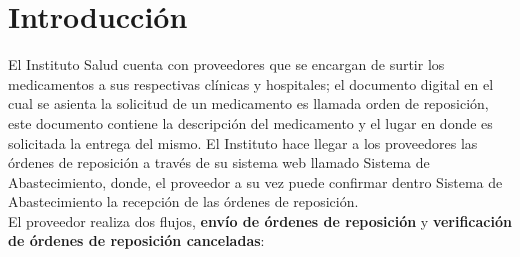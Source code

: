 \documentclass[letterpaper,11pt]{article}
\begin{document}
\section{Introducción}
El Instituto Salud cuenta con proveedores que se encargan de surtir los medicamentos a sus respectivas clínicas y hospitales; el documento digital en el cual se asienta la solicitud de un medicamento es llamada orden de reposición, este documento contiene la descripción del medicamento y el lugar en donde es solicitada la entrega del mismo. El Instituto hace llegar a los proveedores las órdenes de reposición a través de su sistema web llamado Sistema de Abastecimiento, donde, el proveedor a su vez puede confirmar dentro Sistema de Abastecimiento la recepción de las órdenes de reposición.\\
El proveedor realiza dos flujos, \textbf{envío de órdenes de reposición} y \textbf{verificación de órdenes de reposición canceladas}:
\end{document}
